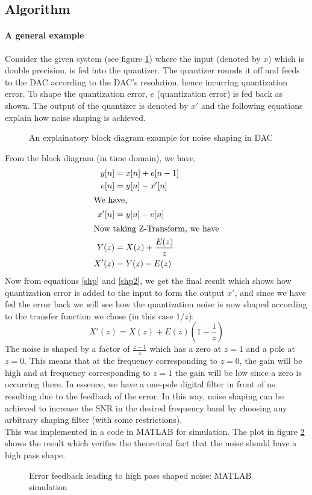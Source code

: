 \documentclass[colorlinks=true,pdfstartview=FitV,linkcolor=blue,
            citecolor=red,urlcolor=magenta]{ligodoc}
\begin{document}
    \subsection{Algorithm}
    \paragraph{A general example}Consider the given system (see figure \ref{nshp}) where the input (denoted by $x$) which is double precision, is fed into the quantizer. The quantizer rounds it off and feeds to the DAC according to the DAC's resolution, hence incurring quantization error. To shape the quantization error, $e$ (quantization error) is fed back as shown. The output of the quantizer is denoted by $x'$ and the following equations explain how noise shaping is achieved.
	\begin{figure}[H]
  		\centering
  		
  		\caption{An explainatory block diagram example for noise shaping in DAC}
		\label{nshp}
	\end{figure}
From the block diagram (in time domain), we have,
	\begin{align}
		y[n]&=x[n]+e[n-1]\\
		e[n]&=y[n]-x'[n]\\
		\intertext{We have,}
		x'[n]&=y[n]-e[n]\\
		\intertext{Now taking Z-Transform, we have}
		\label{shp}		
		Y(z)&=X(z)+\frac{E(z)}{z} \\
		\label{shp2}
		X'(z)&=Y(z)-E(z)
	\end{align}
Now from equations \ref{shp} and \ref{shp2}, we get the final result which shows how quantization error is added to the input to form the output $x'$, and since we have fed the error back we will see how the quantization noise is now shaped according to the transfer function we chose (in this case $1/z$):
\begin{equation}
X'(z)=X(z)+E(z)(1-\frac{1}{z})
\end{equation}
The noise is shaped by a factor of $\frac{z-1}{z}$ which has a zero at $z=1$ and a pole at $z=0$. This means that at the frequency corresponding to $z=0$, the gain will be high and at frequency corresponding to $z=1$ the gain will be low since a zero is occurring there. In essence, we have a one-pole digital filter in front of us resulting due to the feedback of the error. In this way, noise shaping can be achieved to increase the SNR in the desired frequency band by choosing any arbitrary shaping filter (with some restrictions).
\\
This was implemented in a code in MATLAB for simulation. The plot in figure \ref{simple_matlab} shows the result which verifies the theoretical fact that the noise should have a high pass shape.
	\begin{figure}[H]
%		
  		\centering
		\def\svgscale{0.45}
  		\tiny{
  		
  		}
  		\caption{Error feedback leading to high pass shaped noise: MATLAB simulation}
		\label{simple_matlab}
	\end{figure}
\end{document}
